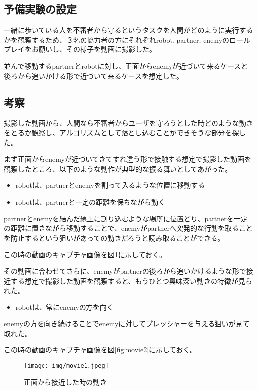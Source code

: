 \documentclass{kuisthesis}
\begin{document}
\subsection{予備実験の設定}

一緒に歩いている人を不審者から守るというタスクを人間がどのように実行するかを観察するため、３名の協力者の方にそれぞれrobot, partner, enemyのロールプレイをお願いし、その様子を動画に撮影した。

並んで移動するpartnerとrobotに対し、正面からenemyが近づいて来るケースと後ろから追いかける形で近づいて来るケースを想定した。

\subsection{考察}
撮影した動画から、人間なら不審者からユーザを守ろうとした時どのような動きをとるか観察し、アルゴリズムとして落とし込むことができそうな部分を探した。

まず正面からenemyが近づいてきてすれ違う形で接触する想定で撮影した動画を観察したところ、以下のような動作が典型的な振る舞いとしてあがった。

\begin{itemize}
\item robotは、partnerとenemyを割って入るような位置に移動する
\item robotは、partnerと一定の距離を保ちながら動く
\end{itemize}

partnerとenemyを結んだ線上に割り込むような場所に位置どり、partnerを一定の距離に置きながら移動することで、enemyがpartnerへ突発的な行動を取ることを防止するという狙いがあっての動きだろうと読み取ることができる。

この時の動画のキャプチャ画像を図\ref{fig:movie1}に示しておく。

その動画に合わせてさらに、enemyがpartnerの後ろから追いかけるような形で接近する想定で撮影した動画を観察すると、もうひとつ興味深い動きの特徴が見られた。

\begin{itemize}
\item robotは、常にenemyの方を向く
\end{itemize}

enemyの方を向き続けることでenemyに対してプレッシャーを与える狙いが見て取れた。

この時の動画のキャプチャ画像を図\ref{fig:movie2}に示しておく。


\begin{figure}[p]\begin{center}
	\texttt{[image: img/movie1.jpeg]}
	\caption{正面から接近した時の動き}
	\label{fig:movie1}
\end{center}\end{figure}
\end{document}
